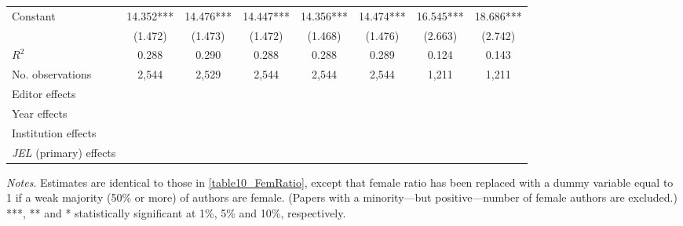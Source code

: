 \begin{table}
\begin{adjustwidth}{-0.085cm}{}
\begin{threeparttable}
\begin{tabular}{p{2.64cm}SSSSSSS}
            Constant                      &      14.352***&      14.476***&      14.447***&      14.356***&      14.474***&      16.545***&      18.686***\\
                                          &     (1.472)   &     (1.473)   &     (1.472)   &     (1.468)   &     (1.476)   &     (2.663)   &     (2.742)   \\
            \midrule
            \(R^2\)                       &       0.288   &       0.290   &       0.288   &       0.288   &       0.289   &       0.124   &       0.143   \\
            No. observations              &       2,544   &       2,529   &       2,544   &       2,544   &       2,544   &       1,211   &       1,211   \\
            \midrule
            Editor effects       &           {}   &           {}   &           {}   &           {}   &           {}   &           {}   &           {}   \\
            Year effects                  &           {}   &           {}   &           {}   &           {}   &           {}   &           {}   &           {}   \\
            Institution effects           &           {}   &           {}   &           {}   &           {}   &           {}   &           {}   &           {}   \\
            \textit{JEL} (primary) effects&               &               &               &               &               &               &           {}   \\
            \bottomrule
        \end{tabular}
        \begin{tablenotes}
            \tiny
            \item \textit{Notes}. Estimates are identical to those in \autoref{table10_FemRatio}, except that female ratio has been replaced with a dummy variable equal to 1 if a weak majority (50\% or more) of authors are female. (Papers with a minority---but positive---number of female authors are excluded.) ***, ** and * statistically significant at 1\%, 5\% and 10\%, respectively.
        \end{tablenotes}
    \end{threeparttable}
    \end{adjustwidth}
\end{table}